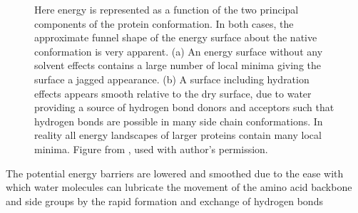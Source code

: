 \begin{figure}[h]
\begin{subfigure}[b]{0.3\textwidth}
    \label{fig:wet}
    \caption{}
\end{subfigure}
\caption{
Here energy is represented as a function of the two principal components of the protein conformation.
In both cases, the approximate funnel shape of the energy surface about the native conformation is very apparent.
(a) An energy surface without any solvent effects contains a large number of local minima giving the surface a jagged appearance.
(b) A surface including hydration effects appears smooth relative to the dry surface, due to water providing a source of hydrogen bond donors and acceptors such that hydrogen bonds are possible in many side chain conformations.
In reality all energy landscapes of larger proteins contain many local minima.
Figure from \protect\cite{waterwebsite}, used with author's permission.
}
\label{fig:funnel}
\end{figure}

The potential energy barriers are lowered and smoothed due to the ease with which water molecules can lubricate the movement of the amino acid backbone and side groups by the rapid formation and exchange of hydrogen bonds
